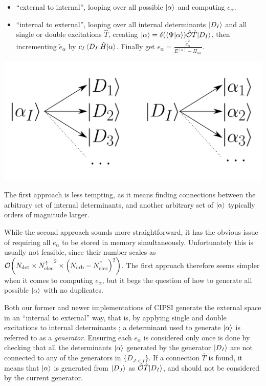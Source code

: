 \documentclass[./thesis.tex]{subfiles}
\begin{document}
\begin{itemize}
\item
``external to internal'', looping over all possible ${\ket{\alpha}}$ and computing $e_\alpha$.
\item
``internal to external'', looping over all internal determinants ${\ket{D_I}}$ and all single or double excitations $\hat T$, creating ${\ket{\alpha}} = \delta \qty(\braket{\Psi}{\alpha} ) {\hat{\mathcal{O}}} \hat T {\ket{D_I}}$, then incrementing $\tilde e_{\alpha}$ by $c_I\mel{D_I}{\hat{H}}{\alpha}$. Finally get $e_{\alpha} = \frac{\tilde e_\alpha^2}{E^{(n)} - H_{\alpha \alpha}}$.
\end{itemize}

	\begin{center}
		\includegraphics[width=0.45\columnwidth]{figures/matrix_dressing/interactions}
	\end{center}

The first approach is less tempting, as it means finding connections between the arbitrary set of internal determinants, and another arbitrary set of ${\ket{\alpha}}$ typically orders of magnitude larger.

While the second approach sounds more straightforward, it has the obvious issue of requiring all $e_\alpha$ to be stored in memory simultaneously. Unfortunately this is usually not feasible, since their number scales as $\order{\Ndet \times \Nalpha^2 \times \qty(\Norb - \Nalpha)^2}$.
The first approach therefore seems simpler when it comes to computing $e_\alpha$, but it begs the question of how to generate all possible ${\ket{\alpha}}$ with no duplicates. 

Both our former and newer implementations of CIPSI generate the external space in an ``internal to external'' way, that is, by applying single and double excitations to internal determinants ; a determinant used to generate ${\ket{\alpha}}$ is referred to as a \emph{generator}.
Ensuring each $e_\alpha$ is considered only once is done by checking that all the determinants ${\ket{\alpha}}$ generated by the generator ${\ket{D_I}}$ are not connected to any of the generators in $\{ D_{J<I} \}$.
If a connection $\hat T$ is found, it means that ${\ket{\alpha}}$ is generated from ${\ket{D_J}}$ as ${\hat{\mathcal{O}}} \hat T {\ket{D_I}}$, and should not be considered by the current generator.
\end{document}
